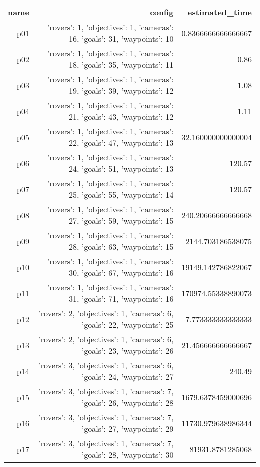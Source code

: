 \documentclass{article}
\begin{document}
                            \begin{center}
                            \scriptsize
                            \begin{tabular}{r|r|r}
                            name & config & estimated\_time\\\midrule
                              p01&{'rovers': 1, 'objectives': 1, 'cameras': 16, 'goals': 31, 'waypoints': 10}&0.8366666666666667\\
  p02&{'rovers': 1, 'objectives': 1, 'cameras': 18, 'goals': 35, 'waypoints': 11}&0.86\\
  p03&{'rovers': 1, 'objectives': 1, 'cameras': 19, 'goals': 39, 'waypoints': 12}&1.08\\
  p04&{'rovers': 1, 'objectives': 1, 'cameras': 21, 'goals': 43, 'waypoints': 12}&1.11\\
  p05&{'rovers': 1, 'objectives': 1, 'cameras': 22, 'goals': 47, 'waypoints': 13}&32.160000000000004\\
  p06&{'rovers': 1, 'objectives': 1, 'cameras': 24, 'goals': 51, 'waypoints': 13}&120.57\\
  p07&{'rovers': 1, 'objectives': 1, 'cameras': 25, 'goals': 55, 'waypoints': 14}&120.57\\
  p08&{'rovers': 1, 'objectives': 1, 'cameras': 27, 'goals': 59, 'waypoints': 15}&240.20666666666668\\
  p09&{'rovers': 1, 'objectives': 1, 'cameras': 28, 'goals': 63, 'waypoints': 15}&2144.703186538075\\
  p10&{'rovers': 1, 'objectives': 1, 'cameras': 30, 'goals': 67, 'waypoints': 16}&19149.142786822067\\
  p11&{'rovers': 1, 'objectives': 1, 'cameras': 31, 'goals': 71, 'waypoints': 16}&170974.55338890073\\
  p12&{'rovers': 2, 'objectives': 1, 'cameras': 6, 'goals': 22, 'waypoints': 25}&7.773333333333333\\
  p13&{'rovers': 2, 'objectives': 1, 'cameras': 6, 'goals': 23, 'waypoints': 26}&21.456666666666667\\
  p14&{'rovers': 3, 'objectives': 1, 'cameras': 6, 'goals': 24, 'waypoints': 27}&240.49\\
  p15&{'rovers': 3, 'objectives': 1, 'cameras': 7, 'goals': 26, 'waypoints': 28}&1679.6378459000696\\
  p16&{'rovers': 3, 'objectives': 1, 'cameras': 7, 'goals': 27, 'waypoints': 29}&11730.979638986344\\
  p17&{'rovers': 3, 'objectives': 1, 'cameras': 7, 'goals': 28, 'waypoints': 30}&81931.8781285068\\

\end{tabular}
\end{center}
\end{document}
